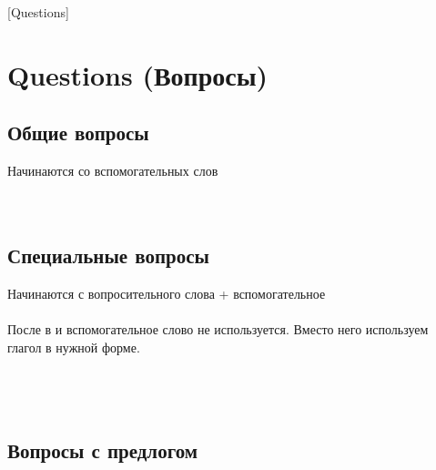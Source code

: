 [Questions]
\section{Questions (Вопросы)}
\subsection{Общие вопросы}
Начинаются со вспомогательных слов\\
\\
\\

\subsection{Специальные вопросы}
\p
Начинаются с вопросительного слова + вспомогательное\\
\\
\bld{*} После  в  и 
вспомогательное слово не используется. Вместо него используем глагол в нужной форме.\\
\\
\\
\\

\subsection{Вопросы с предлогом}
